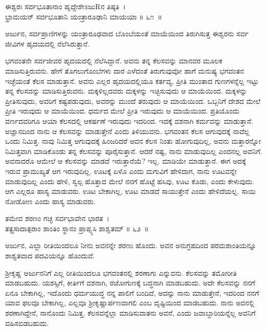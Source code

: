 \begin{shloka}
ಈಶ್ವರಃ ಸರ್ವಭೂತಾನಾಂ ಹೃದ್ದೇಶೇಽಜುRನ ತಿಷ್ಠತಿ~।\\ಭ್ರಾಮಯನ್ ಸರ್ವಭೂತಾನಿ ಯಂತ್ರಾರೂಢಾನಿ ಮಾಯಯಾ \hfill॥ ೬೧~॥
\end{shloka}

\begin{artha}
ಅರ್ಜುನ, ಸರ್ವಪ್ರಾಣಿಗಳನ್ನು ಯಂತ್ರಾರೂಢವಾದ ಬೊಂಬೆಯಂತೆ ಮಾಯೆಯಿಂದ ತಿರುಗಿಸುತ್ತ ಈಶ್ವರನು ಸರ್ವ ಜೀವಿಗಳ ಹೃದಯದಲ್ಲಿ ನೆಲೆಸಿರುತ್ತಾನೆ.
\end{artha}

ಭಗವಂತನೇ ಸರ್ವಜೀವರ ಹೃದಯದಲ್ಲಿ ನೆಲೆಸಿದ್ದಾನೆ. ಅವನು ತನ್ನ ಕೆಲಸವನ್ನು ಮಾನವರ ಮೂಲಕ ಮಾಡಿಸುತ್ತಿರುವನು. ಹೇಗೆ ತೊಗಲುಗೊಂಬೆಗಳು ದಾರ ಎಳೆದಂತೆ ತಿರುಗುವುವೋ ಹಾಗೆ ಮನುಷ್ಯ ಭಗವಂತನ ಇಚ್ಛೆಯಂತೆ ಕೆಲಸ ಮಾಡುತ್ತಾನೆ. ಅವನು ಎಲ್ಲರ ಹೃದಯದಲ್ಲಿಯೂ ಕರ್ತವ್ಯ, ಪ್ರೀತಿ ಮುಂತಾದ ಗುಣಗಳನ್ನೆಲ್ಲ ಇಟ್ಟು ತನ್ನ ಕೆಲಸವನ್ನು ಮಾಡಿಸುತ್ತಿರುವನು. ಮಕ್ಕಳಿಲ್ಲ\-ದವರು ಮಕ್ಕಳನ್ನು ಇಚ್ಛಿಸುವುದು ಆ ಮಾಯೆಯಿಂದ. ಮಕ್ಕಳನ್ನು ಪ್ರೀತಿಸುವುದು, ಅವರಿಗೆ ಕಷ್ಟಪಡುವುದು, ಅವರನ್ನು ಮುಂದೆ ತರುವುದು ಆ ಮಾಯೆಯಿಂದ. ಒಬ್ಬನಿಗೆ ದೇಶದ ಮೇಲೆ ಪ್ರೀತಿ ಇರುವುದು ಆ ಮಾಯೆಯಿಂದ. ಧರ್ಮದ ಮೇಲೆ ಪ್ರೀತಿ ಇರುವುದು ಆ ಮಾಯೆಯಿಂದ. ಪ್ರತಿಯೊಂದು ವರ್ಣದವರಿಗೂ ಆಯಾ ಕೆಲಸದಲ್ಲಿ ಆಕರ್ಷಣೆ ಇರುವುದು ಇದರಿಂದ. ಇದಕ್ಕೆ ವಶನಾಗಿ ಕರ್ಮವನ್ನು ಮಾಡುತ್ತಾನೆ. ಅಜ್ಞಾನದಿಂದ ನಾನು ಆ ಕೆಲಸವನ್ನು ಮಾಡುತ್ತೇನೆ ಎಂದು ತಿಳಿಯುವನು. ಭಗವಂತನ ಕೆಲಸ ಆಗುವುದಕ್ಕೆ ನಾವೆಲ್ಲ ಒಂದು ನಿಮಿತ್ತ. ನಾವು ನಿಮಿತ್ತ ಆಗುವುದಕ್ಕೆ ಹಿಂಜರಿದರೆ ಅವನ ಕೆಲಸ ನಿಂತು ಹೋಗುವುದಿಲ್ಲ, ಅವನು ಮತ್ತಾರನ್ನೋ ನಿಮಿತ್ತವಾಗಿ ಮಾಡಿಕೊಂಡು ತನ್ನ ಕೆಲಸವನ್ನು ಪೂರೈಸುತ್ತಾನೆ. ಆದರೆ ನಷ್ಟ, ನಾನು ಮಾಡುವುದಿಲ್ಲ ಎಂದನಲ್ಲ ಅವನಿಗೆ. ಅವನಾದರೊ ಆಮೇಲೆ ಆ ಕೆಲಸವನ್ನು ಮಾಡದೆ ಇರುತ್ತಾನೆಯೆ? ಇಲ್ಲ. ಮಾಡಿಯೇ ಮಾಡುತ್ತಾನೆ. ಈಗ ಅದಕ್ಕೆ ಇರುವ ಪ್ರಾಮುಖ್ಯತೆ ಆಗ ಇರುವುದಿಲ್ಲ. ಊಟಕ್ಕೆ ಏಳೊ ಎಂದು ಮಗುವಿಗೆ ಹೇಳಿದಾಗ, ನಾನು ಊಟವನ್ನೇ ಮಾಡುವುದಿಲ್ಲ ಎಂದು ಹೇಳಿ, ಸ್ವಲ್ಪ ಹೊತ್ತಾದ ಮೇಲೆ ನನಗೆ ಹೊಟ್ಟೆ ಹಸಿವು, ಊಟ ಕೊಡು, ಎಂದು ಕೇಳುವುದು. ಆಗ ಎಲ್ಲರೂ ಹಾಸ್ಯ ಮಾಡುವರು. ಊಟ ಬೇಕಾಗಿಲ್ಲ, ಊಟ ಮಾಡದೆ ಸಾಯುತ್ತೇನೆ ಎಂದು ಹೇಳಿದೆಯಲ್ಲ. ಸಾಯಿ ನೋಡೋಣ ಎಂದು ಹಾಸ್ಯ ಮಾಡುವರು.

\begin{shloka}
ತಮೇವ ಶರಣಂ ಗಚ್ಛ ಸರ್ವಭಾವೇನ ಭಾರತ~।\\ತತ್ಪ್ರಸಾದಾತ್ಪರಾಂ ಶಾಂತಿಂ ಸ್ಥಾನಂ ಪ್ರಾಪ್ಸ್ಯಸಿ ಶಾಶ್ವತಮ್ \hfill॥ ೬೨~॥
\end{shloka}

\begin{artha}
ಅರ್ಜುನ, ಎಲ್ಲಾ ರೀತಿಯಿಂದಲೂ ನೀನು ಅವನನ್ನೇ ಶರಣು ಹೊಂದು. ಅವನ ಅನುಗ್ರಹದಿಂದ ಪರಮಶಾಂತಿಯನ್ನೂ ಶಾಶ್ವತವಾದ ಪದವಿಯನ್ನೂ ಹೊಂದುವೆ.
\end{artha}

ಶ‍್ರೀಕೃಷ್ಣ ಅರ್ಜುನನಿಗೆ ಎಲ್ಲ ರೀತಿಯಿಂದಲೂ ಭಗವಂತನಲ್ಲಿ ಶರಣಾಗು ಎನ್ನುವನು. ಕೆಲಸವನ್ನು ತಮೋರೀತಿ ಮಾಡಬಹುದು. ಯಶಸ್ಸಿಗೆ, ಕೀರ್ತಿಗೆ ವಶನಾಗಿ, ರಜೋಗುಣಕ್ಕೆ ಬದ್ಧನಾಗಿ ಮಾಡಬಹುದು. ಅದೇ ಕೆಲಸವನ್ನು ನನಗೆ ಏನೂ ಬೇಕಾಗಿಲ್ಲ, ಇದೊಂದು ಧರ್ಮಯುದ್ಧ ನನ್ನ ಪಾಲಿಗೆ ಬಂದಿದೆ, ಅದನ್ನು ನಾನು ಮಾಡುತ್ತೇನೆ, ಇದರಿಂದ ನನಗೆ ಯಾವ ಫಲವೂ ಬೇಕಾಗಿಲ್ಲ, ಎಲ್ಲವೂ ಶ‍್ರೀಕೃಷ್ಣಾರ್ಪಣವಾಗಲಿ ಎಂಬ ದೃಷ್ಟಿಯಿಂದ ಮಾಡಬಹುದು. ನಾನು ಅವನಲ್ಲಿ ಶರಣಾಗಿದ್ದೇನೆ, ನಾನೊಂದು ನಿಮಿತ್ತ. ಕೆಲಸವನ್ನೆಲ್ಲಾ ಮಾಡಿಸುವಾತನು ಅವನೆ, ಎಂದು ಜವಾಬ್ದಾರಿಯನ್ನೆಲ್ಲ ಅವನಿಗೆ ವಹಿಸಬಿಡಬಹುದು.

